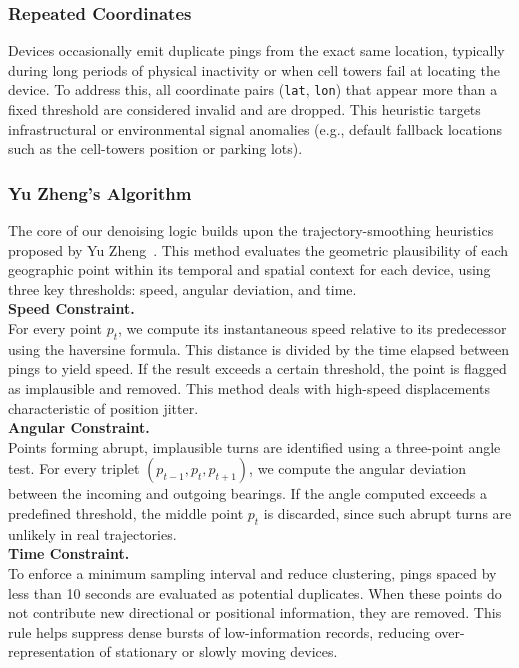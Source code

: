 \documentclass[fleqn,moreauthors,10pt]{ds_report}
\begin{document}
\subsubsection*{Repeated Coordinates}
Devices occasionally emit duplicate pings from the exact same location, typically during long periods of physical inactivity or when cell towers fail at locating the device. To address this, all coordinate pairs (\texttt{lat}, \texttt{lon}) that appear more than a fixed threshold are considered invalid and are dropped. This heuristic targets infrastructural or environmental signal anomalies (e.g., default fallback locations such as the cell-towers position or parking lots).

\subsubsection*{Yu Zheng's Algorithm}
The core of our denoising logic builds upon the trajectory-smoothing heuristics proposed by Yu Zheng~\cite{yuzheng}. This method evaluates the geometric plausibility of each geographic point within its temporal and spatial context for each device, using three key thresholds: speed, angular deviation, and time. \\

\noindent\textbf{Speed Constraint.} \\
For every point \( p_t \), we compute its instantaneous speed relative to its predecessor using the haversine formula. This distance is divided by the time elapsed between pings to yield speed. If the result exceeds a certain threshold, the point is flagged as implausible and removed. This method deals with high-speed displacements characteristic of position jitter. \\

\noindent\textbf{Angular Constraint.} \\
Points forming abrupt, implausible turns are identified using a three-point angle test. For every triplet \((p_{t-1}, p_t, p_{t+1})\), we compute the angular deviation between the incoming and outgoing bearings. If the angle computed exceeds a predefined threshold, the middle point \(p_t\) is discarded, since such abrupt turns are unlikely in real trajectories.\\

\noindent\textbf{Time Constraint.} \\
To enforce a minimum sampling interval and reduce clustering, pings spaced by less than 10 seconds are evaluated as potential duplicates. When these points do not contribute new directional or positional information, they are removed. This rule helps suppress dense bursts of low-information records, reducing over-representation of stationary or slowly moving devices.
\end{document}
